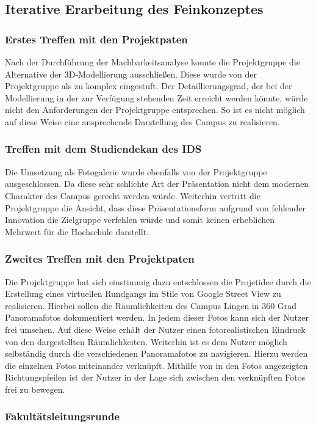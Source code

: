 \subsection{Iterative Erarbeitung des Feinkonzeptes}
\label{sec:ErarbeitungFeinkonzept}



\subsubsection{Erstes Treffen mit den Projektpaten}
\label{sec:Treffen1}

Nach der Durchführung der Machbarkeitsanalyse konnte die Projektgruppe die
Alternative der 3D-Modellierung ausschließen. Diese wurde von der Projektgruppe
als zu komplex eingestuft. Der Detaillierungsgrad, der bei der Modellierung in
der zur Verfügung stehenden Zeit erreicht werden könnte, würde nicht den
Anforderungen der Projektgruppe entsprechen. So ist es nicht möglich auf diese
Weise eine ansprechende Darstellung des Campus zu realisieren. 

\subsubsection{Treffen mit dem Studiendekan des IDS}
\label{sec:Treffen2}

Die Umsetzung als Fotogalerie wurde ebenfalls von der Projektgruppe 
ausgeschlossen. Da diese sehr schlichte Art der Präsentation nicht dem modernen
Charakter des Campus gerecht werden würde. Weiterhin vertritt die Projektgruppe
die Ansicht, dass diese Präsentationsform aufgrund von fehlender Innovation die
Zielgruppe verfehlen würde und somit keinen erheblichen Mehrwert für die
Hochschule darstellt.

\subsubsection{Zweites Treffen mit den Projektpaten}
\label{sec:Treffen3}

Die Projektgruppe hat sich einstimmig dazu entschlossen die Projetidee durch die
Erstellung eines virtuellen Rundgangs im Stile von Google Street View zu
realisieren. Hierbei sollen die Räumlichkeiten des Campus Lingen in 360 Grad
Panoramafotos dokumentiert werden. In jedem dieser Fotos kann sich der Nutzer
frei umsehen. Auf diese Weise erhält der Nutzer einen fotorealistischen Eindruck
von den dargestellten Räumlichkeiten. Weiterhin ist es dem Nutzer möglich
selbständig durch die verschiedenen Panoramafotos zu navigieren. Hierzu werden
die einzelnen Fotos miteinander verknüpft. Mithilfe von in den Fotos
angezeigten Richtungspfeilen ist der Nutzer in der Lage sich zwischen
den verknüpften Fotos frei zu bewegen.

\subsubsection{Fakultätsleitungsrunde}
\label{sec:Treffen4}